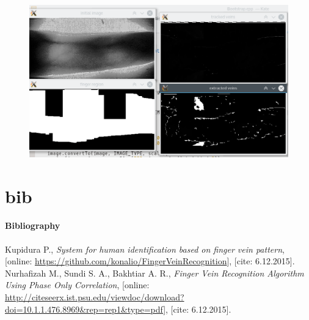 \documentclass[compress]{beamer}
\begin{document}
\begin{frame}
\begin{figure}[ht!]
	\centering
	\includegraphics[width=12cm]{../fig/test_nas.eps}
\end{figure}
\end{frame}



\part{bib}
\subsection{Bibliography}
\begin{frame}
\begin{thebibliography}{10}
	Kupidura P.,
	\emph{System for human identification based on finger vein pattern},
	[online: \url{https://github.com/konalio/FingerVeinRecognition}],
	[cite: 6.12.2015].
	Nurhafizah M., Sundi S. A., Bakhtiar A. R.,
		\emph{Finger Vein Recognition Algorithm Using Phase Only Correlation},
	[online: \url{http://citeseerx.ist.psu.edu/viewdoc/download?doi=10.1.1.476.8969&rep=rep1&type=pdf}],
	[cite: 6.12.2015].

\end{thebibliography}
\end{frame}
\end{document}
